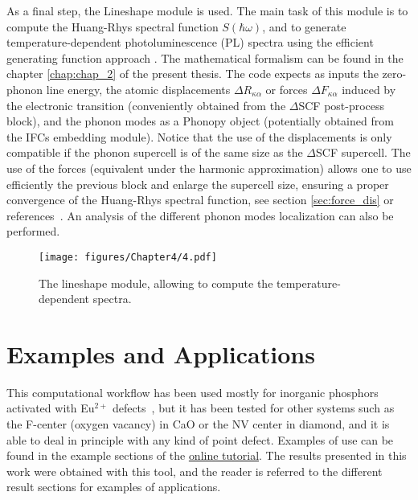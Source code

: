 As a final step, the Lineshape module is used. The main task of this module is to compute the Huang-Rhys spectral function $S(\hbar\omega)$\cite{alkauskas2014,bouquiaux2023first}, and to generate temperature-dependent photoluminescence (PL) spectra using the efficient generating function approach \cite{jin2021photoluminescence}. The mathematical formalism can be found in the chapter \ref{chap:chap_2} of the present thesis. 
The code expects as inputs the zero-phonon line energy, the atomic displacements $\Delta R_{\kappa\alpha}$ or forces $\Delta F_{\kappa\alpha}$ induced by the electronic transition (conveniently obtained from the $\Delta$SCF post-process block), and the phonon modes as a Phonopy object (potentially obtained from the IFCs embedding module). Notice that the use of the displacements is only compatible if the phonon supercell is of the same size as the $\Delta$SCF supercell. The use of the forces (equivalent under the harmonic approximation) allows one to use efficiently the previous block and enlarge the supercell size, ensuring a proper convergence of the Huang-Rhys spectral function, see section \ref{sec:force_dis} or references~\cite{alkauskas2014,jin2021photoluminescence,bouquiaux2023first}. An analysis of the different phonon modes localization can also be performed. 

\begin{figure}[h!]
	\centering
	\texttt{[image: figures/Chapter4/4.pdf]}
	\caption[lineshape module]{The lineshape module, allowing to compute the temperature-dependent spectra.}
	\label{fig:lineshape_module}
\end{figure}


\section*{Examples and Applications}

This computational workflow has been used mostly for inorganic phosphors activated with Eu$^{2+}$ defects~\cite{bouquiaux2021importance,bouquiaux2023first}, but it has been tested for other systems such as the F-center (oxygen vacancy) in CaO or the NV center in diamond, and it is able to deal in principle with any kind of point defect. 
Examples of use can be found in the example sections of the \href{https://jbouquiaux.github.io/lumi_book/intro.html}{ online tutorial}. The results presented in this work were obtained with this tool, and the reader is referred to the different result sections for examples of applications. 
